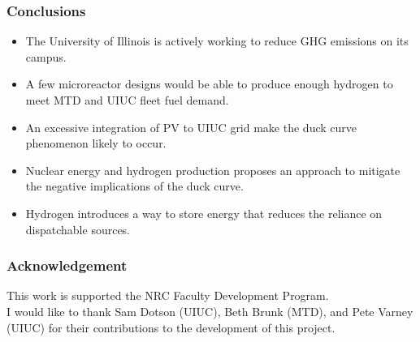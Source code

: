 \begin{frame}
\frametitle{Conclusions}

\begin{itemize}
	\item The University of Illinois is actively working to reduce GHG emissions on its campus. 
	\item A few microreactor designs would be able to produce enough hydrogen to meet MTD and UIUC fleet fuel demand.
	\item An excessive integration of PV to UIUC grid make the duck curve phenomenon likely to occur.
	\item Nuclear energy and hydrogen production proposes an approach to mitigate the negative implications of the duck curve.
	\item Hydrogen introduces a way to store energy that reduces the reliance on dispatchable sources.

\end{itemize}
\end{frame}


\begin{frame}
\frametitle{Acknowledgement}

This work is supported the NRC Faculty Development Program.
\\
I would like to thank Sam Dotson (UIUC), Beth Brunk (MTD), and Pete Varney (UIUC) for their contributions to the development of this project.

\end{frame}